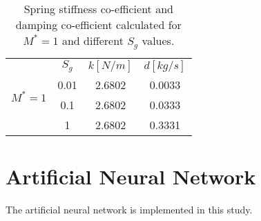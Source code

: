  \begin{table}[H]
 \begin{centering}
  \begin{tabular}[c]{|c|c|c|c|}
   \hline
   \multirow{4}{4em}{$M^{*}=1$} & $S_{g}$ & $k[N/m]$ & $d[kg/s]$\\\cline{2-4}
   & 0.01 & 2.6802 & 0.0033 \\ \cline{2-4}
   & 0.1 & 2.6802 & 0.0333 \\ \cline{2-4}
   & 1 & 2.6802 & 0.3331 \\ 
   \hline
  \end{tabular}
 \caption{Spring stiffness co-efficient and damping co-efficient calculated for $M^*=1$ and different $S_{g}$ values.}
 \label{table:2.1}
 \end{centering}
 \end{table}
\section{Artificial Neural Network}
The artificial neural network is implemented in this study.


      
 










